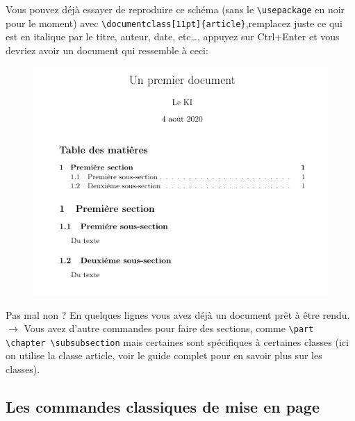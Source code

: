 \documentclass[11pt]{article}				%
\newcommand{\tb}{\textbackslash}
\begin{document}
Vous pouvez déjà essayer de reproduire ce schéma (sans le \texttt{\tb usepackage} en noir pour le moment) avec \texttt{\tb documentclass[11pt]\{article\}},remplacez juste ce qui est en italique par le titre, auteur, date, etc\dots, appuyez sur Ctrl+Enter et vous devriez avoir un document qui ressemble à ceci:
\begin{figure}[h!]
\begin{center}
	\includegraphics[scale=0.4]{ressources/frover.png}
\end{center}	

\end{figure}


Pas mal non ? En quelques lignes vous avez déjà un document prêt à être rendu.\\

$\rightarrow$ Vous avez d'autre commandes pour faire des sections, comme \texttt{\tb part  \tb chapter  \tb subsubsection} mais certaines sont spécifiques à certaines classes (ici on utilise la classe article, voir le guide complet pour en savoir plus sur les classes).

\subsection*{Les commandes classiques de mise en page}
\end{document}

